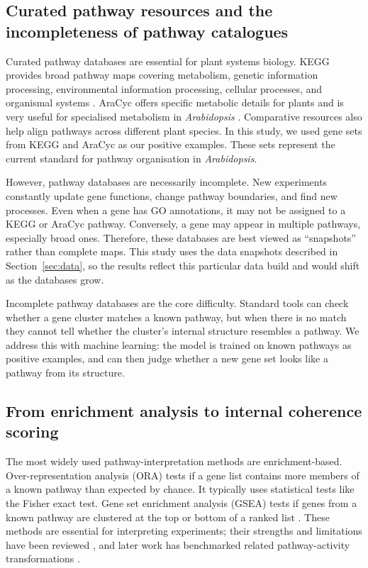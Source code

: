 \documentclass[12pt,twoside]{article}
\begin{document}
\subsection{Curated pathway resources and the incompleteness of pathway catalogues}
\label{sec:bg_pathway_databases}

Curated pathway databases are essential for plant systems biology. KEGG provides broad pathway maps covering metabolism, genetic information processing, environmental information processing, cellular processes, and organismal systems \citep{kanehisa2023kegg}. AraCyc offers specific metabolic details for plants and is very useful for specialised metabolism in \textit{Arabidopsis} \citep{hawkins2021plant}. Comparative resources also help align pathways across different plant species. In this study, we used gene sets from KEGG and AraCyc as our positive examples. These sets represent the current standard for pathway organisation in \textit{Arabidopsis}.

However, pathway databases are necessarily incomplete. New experiments constantly update gene functions, change pathway boundaries, and find new processes. Even when a gene has GO annotations, it may not be assigned to a KEGG or AraCyc pathway. Conversely, a gene may appear in multiple pathways, especially broad ones. Therefore, these databases are best viewed as ``snapshots'' rather than complete maps. This study uses the data snapshots described in Section~\ref{sec:data}, so the results reflect this particular data build and would shift as the databases grow.

Incomplete pathway databases are the core difficulty. Standard tools can check whether a gene cluster matches a known pathway, but when there is no match they cannot tell whether the cluster's internal structure resembles a pathway. We address this with machine learning: the model is trained on known pathways as positive examples, and can then judge whether a new gene set looks like a pathway from its structure.

\subsection{From enrichment analysis to internal coherence scoring}
\label{sec:bg_enrichment_vs_coherence}

The most widely used pathway-interpretation methods are enrichment-based. Over-representation analysis (ORA) tests if a gene list contains more members of a known pathway than expected by chance. It typically uses statistical tests like the Fisher exact test. Gene set enrichment analysis (GSEA) tests if genes from a known pathway are clustered at the top or bottom of a ranked list \citep{subramanian2005gsea}. These methods are essential for interpreting experiments; their strengths and limitations have been reviewed \citep{khatri2012ten}, and later work has benchmarked related pathway-activity transformations \citep{zhang2020pathway}.
\end{document}
